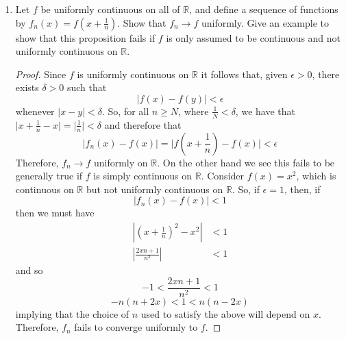 \begin{enumerate}
    \begin{proof}
    Let the assumptions hold. Since \( g \) is continuous on \( K \), which is compact, it follows that \( g(K) \) is bounded. Therefore, since we also have that \( g(x) \neq 0 \) it follows that there exist \( S \geq M > 0 \) such that
    \[
    M \leq \vert g(x) \vert \leq S
    \]
    for all \( x \in K \). Now let \( \epsilon > 0 \) be given. By uniform convergence of \( f_n \) it follows that there exists \( N \in \mathbb{N} \) such that \( n \geq N \) implies
    \[
    \vert f_n(x) - f(x) \vert < \epsilon M
    \]
    for all \( x \in K \). Therefore, for \( n \geq N \) we have
    \[
    \left| \frac{f_n(x)-f(x)}{g(x)} \right| = \frac{\vert f_n(x) - f(x) \vert}{\vert g(x) \vert} \leq \frac{\vert f_n(x) - f(x) \vert}{M} < \frac{\epsilon M}{M} = \epsilon
    \]
    for all \( x \in K \). Therefore, \( \frac{f_n}{g} \rightarrow \frac{f}{g} \) uniformly on \( K \). 
    \end{proof}
    
    \item Let \( f \) be uniformly continuous on all of \( \mathbb{R} \), and define a sequence of functions by \( f_n(x) = f\left(x+\frac{1}{n}\right) \). Show that \( f_n \rightarrow f \) uniformly. Give an example to show that this proposition fails if \( f \) is only assumed to be continuous and not uniformly continuous on \( \mathbb{R} \).
    
    \begin{proof}
    Since \( f \) is uniformly continuous on \( \mathbb{R} \) it follows that, given \( \epsilon > 0 \), there exists \( \delta > 0 \) such that
    \[
    \vert f(x) - f(y) \vert < \epsilon
    \]
    whenever \( \vert x - y \vert < \delta \). So, for all \( n \geq N \), where \( \frac{1}{N} < \delta \), we have that \( \vert x+ \frac{1}{n} - x \vert = \vert \frac{1}{n} \vert < \delta \) and therefore that
    \[
    \vert f_n(x) - f(x) \vert = \vert f\left( x+ \frac{1}{n} \right) - f(x) \vert < \epsilon
    \]
    Therefore, \( f_n \rightarrow f \) uniformly on \( \mathbb{R} \). On the other hand we see this fails to be generally true if \( f \) is simply continuous on \( \mathbb{R} \). Consider \( f(x) = x^2 \), which is continuous on \( \mathbb{R} \) but not uniformly continuous on \( \mathbb{R} \). So, if \( \epsilon = 1 \), then, if
    \[
    \vert f_n(x) - f(x) \vert < 1
    \]
    then we must have
    \begin{align*}
        \left| \left(x+\frac{1}{n}\right)^2 - x^2 \right| &< 1 \\
        \left| \frac{2xn+1}{n^2} \right| &< 1
    \end{align*}
    and so 
    \[
    -1 < \frac{2xn+1}{n^2} < 1
    \]
    \[
    -n(n+2x) < 1 < n(n-2x)
    \]
    implying that the choice of \( n \) used to satisfy the above will depend on \( x \). Therefore, \( f_n \) fails to converge uniformly to \( f \). 
    \end{proof}
    

\end{enumerate}
